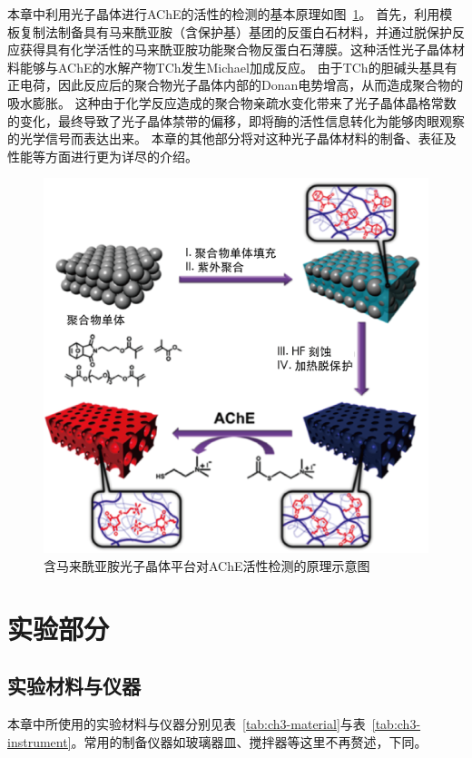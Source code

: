 本章中利用光子晶体进行AChE的活性的检测的基本原理如图~\ref{fig:maleimide-photonic-principle}。
首先，利用模板复制法制备具有马来酰亚胺（含保护基）基团的反蛋白石材料，并通过脱保护反应获得具有化学活性的马来酰亚胺功能聚合物反蛋白石薄膜。这种活性光子晶体材料能够与AChE的水解产物TCh发生Michael加成反应。
由于TCh的胆碱头基具有正电荷，因此反应后的聚合物光子晶体内部的Donan电势增高，从而造成聚合物的吸水膨胀。
这种由于化学反应造成的聚合物亲疏水变化带来了光子晶体晶格常数的变化，最终导致了光子晶体禁带的偏移，即将酶的活性信息转化为能够肉眼观察的光学信号而表达出来。
本章的其他部分将对这种光子晶体材料的制备、表征及性能等方面进行更为详尽的介绍。
\begin{figure}[htbp]
  \centering
  \includegraphics[width=0.85\linewidth]{figures/ch3/principle.png}
  \caption{含马来酰亚胺光子晶体平台对AChE活性检测的原理示意图}
  \label{fig:maleimide-photonic-principle}
\end{figure}

\section{实验部分}
\label{sec:ch3-exp}

\subsection{实验材料与仪器}
本章中所使用的实验材料与仪器分别见表~\ref{tab:ch3-material}与表~\ref{tab:ch3-instrument}。常用的制备仪器如玻璃器皿、搅拌器等这里不再赘述，下同。

